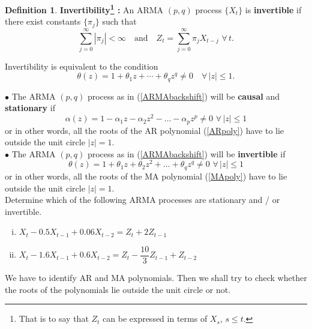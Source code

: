 \documentclass[11pt, a4paper]{article}
\numberwithin{equation}{section}
\theoremstyle{definition}
\newtheorem{definition}{Definition}[section]
\begin{document}
\vspace{0.4cm}

\begin{definition}
\textbf{Invertibility\footnote{That is to say that $Z_t$ can be expressed in terms of $X_s$, $s \leq t$.} :} An ARMA $(p,q)$ process $\{X_t\}$ is \textbf{invertible} if there exist constants $\{\pi_j\}$ such that
$$\sum \limits_{j=0}^{\infty} |\pi_j| < \infty \quad \text{and} \quad Z_t = \sum \limits_{j=0}^{\infty} \pi_j X_{t-j} \,\, \forall \, t.$$

Invertibility is equivalent to the condition
$$\theta(z) = 1 + \theta_1 z + \cdots + \theta_q z^q \neq 0
\quad \forall \, |z| \leq 1.$$

\end{definition}

$\bullet$ The ARMA $(p, q)$ process as in (\ref{ARMAbackshift}) will be \textbf{causal} and \textbf{stationary} if
\begin{equation}\label{ARMAcausalcondition}
\alpha(z) = 1 - \alpha_1 z - \alpha_2 z^2 - \ldots - \alpha_p z^p \neq 0 \,\, \forall \, |z| \leq 1
\end{equation}
or in other words, all the roots of the AR polynomial (\ref{ARpoly}) have to lie outside the unit circle $|z| = 1$. \\[0.5em]

$\bullet$ The ARMA $(p, q)$ process as in (\ref{ARMAbackshift}) will be \textbf{invertible} if
\begin{equation}\label{ARMAinvertiblecondition}
\theta(z) = 1 + \theta_1 z + \theta_2 z^2 + \ldots + \theta_q z^q \neq 0 \,\, \forall \, |z| \leq 1
\end{equation}
or in other words, all the roots of the MA polynomial (\ref{MApoly}) have to lie outside the unit circle $|z| = 1$. \\[0.5em]

\bcquestion \hspace{0.1cm} Determine which of the following ARMA processes are stationary and / or invertible.
\begin{enumerate}[(i)]
\item $X_t - 0.5 X_{t-1} + 0.06 X_{t-2} = Z_t + 2 Z_{t-1}$
\item $X_t - 1.6 X_{t-1} + 0.6 X_{t-2} = Z_t - \dfrac{10}{3}Z_{t-1} + Z_{t-2}$
\end{enumerate}

\bccrayon \hspace{0.1cm} We have to identify AR and MA polynomials. Then we shall try to check whether the roots of the polynomials lie outside the unit circle or not.
\end{document}
